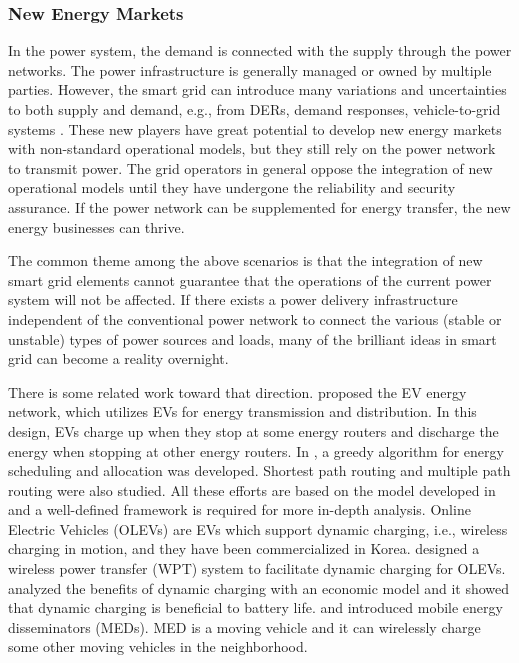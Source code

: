 \documentclass[journal]{IEEEtran}
\begin{document}
\subsubsection{New Energy Markets}
In the power system, the demand is connected with the supply through the power networks. The power infrastructure is generally managed or owned by multiple parties. However, the smart grid can introduce many variations and uncertainties to both supply and demand, e.g., from DERs, demand responses, vehicle-to-grid systems \cite{V2GMarket}. These new players have great potential to develop new energy markets with non-standard operational models, but they still rely  on the power network to transmit power. 
The grid operators in general oppose the integration of new operational models until they have undergone the reliability and security assurance. If the power network can be supplemented for energy transfer, the new energy businesses can thrive.

The common theme among the above scenarios is that the integration of new smart grid elements cannot guarantee that the operations of the current power system will not be affected.  If there exists a power delivery infrastructure independent of the conventional power network to connect the various (stable or unstable) types of power sources and loads, many of the brilliant ideas in smart grid can become a reality overnight. 

There is some related work toward that direction.
\cite{EVnetICC} proposed the EV energy network, which utilizes EVs for energy transmission and distribution.
In this design, EVs charge up when they stop at some energy routers and discharge the energy when stopping at other energy routers. In \cite{EVnetISGT}, a greedy algorithm for energy scheduling and allocation was developed. Shortest path routing \cite{EVnetMASS} and multiple path routing \cite{EVnetISGT2014} were also studied.
All these efforts are based on the model developed in \cite{EVnetICC} and a well-defined framework is required for more in-depth analysis.
Online Electric Vehicles (OLEVs) \cite{OLEV} are EVs which support dynamic charging, i.e., wireless charging in motion, and they have been commercialized in Korea. \cite{OLEV_wireless} designed a wireless power transfer (WPT) system to facilitate dynamic charging for OLEVs. \cite{OLEV_econ} analyzed the benefits of dynamic charging with an economic model and it showed that dynamic charging is beneficial to battery life.
\cite{MED1} and \cite{MED2} introduced mobile energy disseminators (MEDs). MED is a moving vehicle and it can wirelessly charge some other moving vehicles in the neighborhood. 
\end{document}
